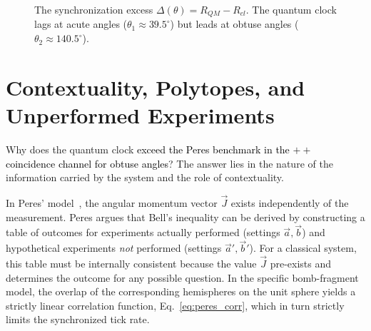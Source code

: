 \documentclass[reprint,aps,pra,longbibliography]{revtex4-2}
\newcommand{\rev}[1]{\textcolor{black}{#1}} %
\begin{document}
\begin{figure}[t]
\centering
{}
\caption{The synchronization excess $\Delta(\theta) = R_{QM} - R_{cl}$. The quantum clock lags at acute angles ($\theta_1 \approx 39.5^\circ$) but leads at obtuse angles ($\theta_2 \approx 140.5^\circ$).}
\label{fig:delta}
\end{figure}

\section{Contextuality, Polytopes, and Unperformed Experiments}

Why does the quantum clock \rev{exceed the Peres benchmark in the $++$ coincidence channel for obtuse angles}? The answer lies in the nature of the information carried by the system and the role of contextuality.

In Peres' model~\cite{peres222}, the angular momentum vector $\vec{J}$ exists independently of the measurement. Peres argues that Bell's inequality can be derived by constructing a table of outcomes for experiments actually performed (settings $\vec{a}, \vec{b}$) and hypothetical experiments \emph{not} performed (settings $\vec{a}', \vec{b}'$). For a classical system, this table must be internally consistent because the value $\vec{J}$ pre-exists and determines the outcome for any possible question. In the specific bomb-fragment model, the overlap of the corresponding hemispheres on the unit sphere yields a strictly linear correlation function, Eq.~\eqref{eq:peres_corr}, which in turn strictly limits the synchronized tick rate.
\end{document}
